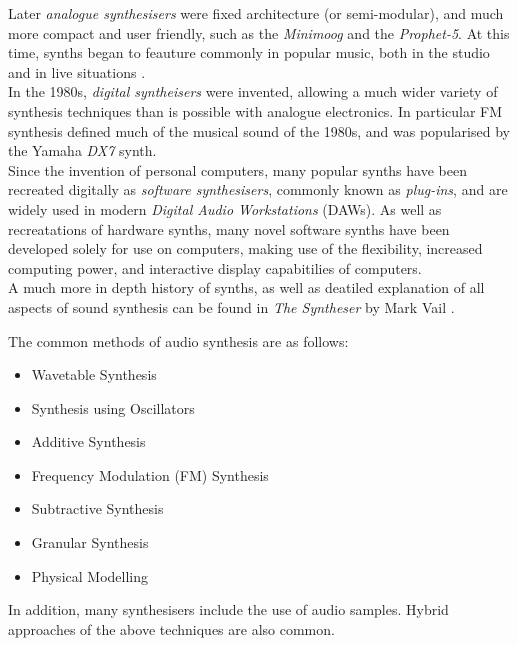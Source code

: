 \documentclass[11pt, oneside]{report}   	%
\begin{document}
Later \emph{analogue synthesisers} were fixed architecture (or semi-modular), and much more compact and user friendly, such as the \emph{Minimoog} and the \emph{Prophet-5}. At this time, synths began to feauture commonly in popular music, both in the studio and in live situations \cite{Synth}.\\
In the 1980s, \emph{digital syntheisers} were invented, allowing a much wider variety of synthesis techniques than is possible with analogue electronics. In particular FM synthesis defined much of the musical sound of the 1980s, and was popularised by the Yamaha \emph{DX7} synth.\\
Since the invention of personal computers, many popular synths have been recreated digitally as \emph{software synthesisers}, commonly known as \emph{plug-ins}, and are widely used in modern \emph{Digital Audio Workstations} (DAWs). As well as recreatations of hardware synths, many novel software synths have been developed solely for use on computers, making use of the flexibility, increased computing power, and interactive display capabitilies of computers.\\
A much more in depth history of synths, as well as deatiled explanation of all aspects of sound synthesis can be found in \emph{The Syntheser} by Mark Vail \cite{Synth}.

The common methods of audio synthesis are as follows: \cite{SynthTypes}
\begin{itemize}
	\vspace{-10pt}
	\setlength\itemsep{-1.2em}
	\item Wavetable Synthesis
	\item Synthesis using Oscillators
	\item Additive Synthesis
	\item Frequency Modulation (FM) Synthesis
	\item Subtractive Synthesis
	\item Granular Synthesis
	\item Physical Modelling
		\vspace{-10pt}
\end{itemize}
In addition, many synthesisers include the use of audio samples. Hybrid approaches of the above techniques are also common.
\end{document}
